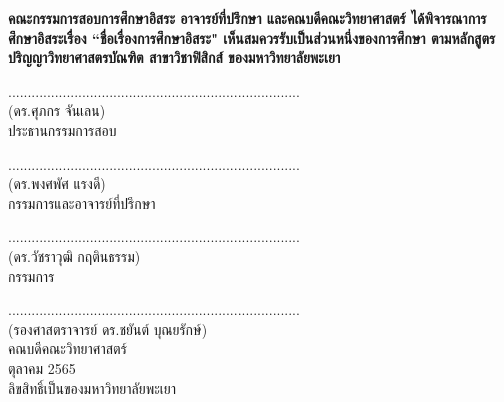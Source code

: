 \documentclass[a4paper,12pt]{upthesis}
\begin{document}
\textbf{คณะกรรมการสอบการศึกษาอิสระ อาจารย์ที่ปรึกษา และคณบดีคณะวิทยาศาสตร์ ได้พิจารณาการศึกษาอิสระเรื่อง ``ชื่อเรื่องการศึกษาอิสระ" เห็นสมควรรับเป็นส่วนหนึ่งของการศึกษา ตามหลักสูตรปริญญาวิทยาศาสตรบัณฑิต สาขาวิชาฟิสิกส์ ของมหาวิทยาลัยพะเยา}
\vskip0.6cm
\normalsize
\begin{center}
\vskip2.5cm

...........................................................................\\
(ดร.ศุภกร จันเลน)\\		%
ประธานกรรมการสอบ \\ 
\vskip2.5cm

...........................................................................\\
(ดร.พงศพัศ แรงดี)\\			%
กรรมการและอาจารย์ที่ปรึกษา \\ 	
\vskip2.5cm

...........................................................................\\
(ดร.วัชราวุฒิ กฤตินธรรม)\\			%
กรรมการ \\ 
\vskip2.5cm



...........................................................................\\
(รองศาสตราจารย์ ดร.ชยันต์ บุณยรักษ์)\\
คณบดีคณะวิทยาศาสตร์\\
ตุลาคม 2565\\
ลิขสิทธิ์เป็นของมหาวิทยาลัยพะเยา \\
\end{center}
\clearpage

\end{document}
